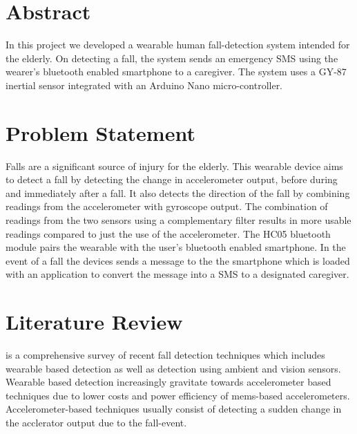 \documentclass[11pt, a4paper]{article}
\begin{document}
\pagestyle{plain}
\def\title{Human Fall Detection}
\def\what{EE712 Embedded System Design}
\def\who{Simranjeet Singh (183076005) [183076005@iitb.ac.in] \\
Sonali Shukla (184070014) [184070014@iitb.ac.in] \\
Niraj N Sharma (184077001) [nirajns@iitb.ac.in] \\
Group 20}
\def\guide{Prof.~P.~C.~Pandey \& Prof.~D.~K.~Sharma}
\titlpage
\newpage

\section*{Abstract}
In this project we developed a wearable human fall-detection system
intended for the elderly. On detecting a fall, the system sends an
emergency SMS using the wearer's bluetooth enabled smartphone to a
caregiver. The system uses a GY-87 inertial sensor integrated with an
Arduino Nano micro-controller.

\section{Problem Statement}
Falls are a significant source of injury for the elderly. This wearable
device aims to detect a fall by detecting the change in accelerometer
output, before during and immediately after a fall. It also detects the
direction of the fall by combining readings from the accelerometer with
gyroscope output. The combination of readings from the two sensors using a
complementary filter results in more usable readings compared to
just the use of the accelerometer. The HC05 bluetooth module pairs the
wearable with the user's bluetooth enabled smartphone. In the event of a
fall the devices sends a message to the the smartphone which is loaded
with an application to convert the message into a SMS to a designated
caregiver.

\section{Literature Review}
\cite{Mubashir2013} is a comprehensive survey of recent fall detection
techniques which includes wearable based detection as well as detection
using ambient and vision sensors. Wearable based detection increasingly
gravitate towards accelerometer based techniques due to lower costs and
power efficiency of mems-based accelerometers. Accelerometer-based techniques
usually consist of detecting a sudden change in the acclerator output due to
the fall-event.
\end{document}
